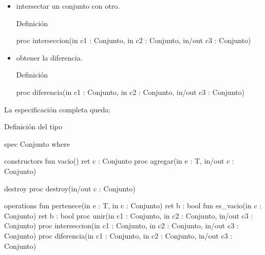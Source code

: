 \begin{itemize}
\begin{itemize}
\begin{codebox}{Definición}
\begin{pascallike}
                    in/out c3 : Conjunto)
            \end{pascallike}
        \end{codebox}
        \item intersectar un conjunto con otro.
        \begin{codebox}{Definición}
            \begin{pascallike}
                proc interseccion(in c1 : Conjunto, in c2 : Conjunto, 
                    in/out c3 : Conjunto)
            \end{pascallike}
        \end{codebox}
        \item obtener la diferencia.
        \begin{codebox}{Definición}
            \begin{pascallike}
                proc diferencia(in c1 : Conjunto, in c2 : Conjunto, 
                    in/out c3 : Conjunto)
            \end{pascallike}
        \end{codebox}
    \end{itemize}
\end{itemize}

La especificación completa queda:
\begin{codebox}{Definición del tipo}
\begin{pascallike}
spec Conjunto where 

constructors
    fun vacio() ret c : Conjunto
    proc agregar(in e : T, in/out c : Conjunto)

destroy 
    proc destroy(in/out c : Conjunto)

operations
    fun pertenece(in e : T, in c : Conjunto) ret b : bool
    fun es_vacio(in c : Conjunto) ret b : bool
    proc unir(in c1 : Conjunto, in c2 : Conjunto, in/out c3 : Conjunto)
    proc interseccion(in c1 : Conjunto, in c2 : Conjunto, in/out c3 : Conjunto)
    proc diferencia(in c1 : Conjunto, in c2 : Conjunto, in/out c3 : Conjunto)
\end{pascallike}
\end{codebox}

